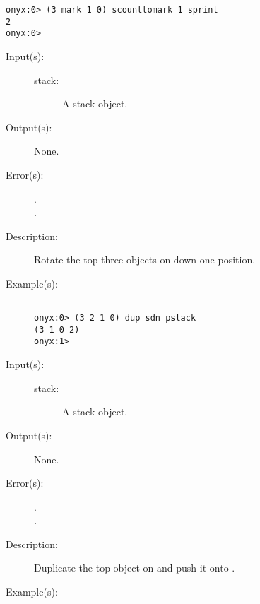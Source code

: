 \begin{description}
\begin{description}
\begin{verbatim}
onyx:0> (3 mark 1 0) scounttomark 1 sprint
2
onyx:0>
		\end{verbatim}
	\end{description}
\label{systemdict:sdn}
\item[{\onyxop{stack}{sdn}{--}}: ]
	\begin{description}\item[]
	\item[Input(s): ]
		\begin{description}\item[]
		\item[stack: ]
			A stack object.
		\end{description}
	\item[Output(s): ] None.
	\item[Error(s): ]
		\begin{description}\item[]
		\item[.]
		\item[.]
		\end{description}
	\item[Description: ]
		Rotate the top three objects on  down one position.
	\item[Example(s): ]\begin{verbatim}

onyx:0> (3 2 1 0) dup sdn pstack
(3 1 0 2)
onyx:1>
		\end{verbatim}
	\end{description}
\label{systemdict:sdup}
\item[{\onyxop{stack}{sdup}{--}}: ]
	\begin{description}\item[]
	\item[Input(s): ]
		\begin{description}\item[]
		\item[stack: ]
			A stack object.
		\end{description}
	\item[Output(s): ] None.
	\item[Error(s): ]
		\begin{description}\item[]
		\item[.]
		\item[.]
		\end{description}
	\item[Description: ]
		Duplicate the top object on  and push it onto
		.
	\item[Example(s): ]\begin{verbatim}


\end{verbatim}
\end{description}
\end{description}
